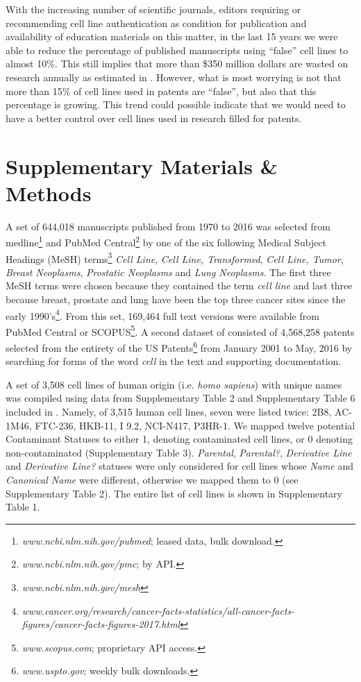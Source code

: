 \documentclass[12pt]{article}
\begin{document}
With the increasing number of scientific journals, editors requiring or recommending cell line authentication as condition for publication and availability of education materials on this matter, in the last 15 years we were able to reduce the percentage of published manuscripts using ``false'' cell lines to almost 10\%. This still implies that more than \$350 million dollars are wasted on research annually as estimated in \cite{freedman2014culture, freedman2015economics}. However, what is most worrying is not that more than 15\% of cell lines used in patents are ``false'', but also that this percentage is growing. This trend could possible indicate that we would need to have a better control over cell lines used in research filled for patents.

\section{Supplementary Materials \& Methods}
A set of 644,018 manuscripts published from 1970 to 2016 was selected from medline\footnote{\textit{www.ncbi.nlm.nih.gov/pubmed}; leased data, bulk download.} and PubMed Central\footnote{\textit{www.ncbi.nlm.nih.gov/pmc}; by API.} by one of the six following Medical Subject Headings (MeSH) terms\footnote{\textit{www.ncbi.nlm.nih.gov/mesh}} \textit{Cell Line}, \textit{Cell Line, Transformed}, \textit{Cell Line, Tumor}, \textit{Breast Neoplasms}, \textit{Prostatic Neoplasms} and \textit{Lung Neoplasms}. The first three MeSH terms were chosen because they contained the term \textit{cell line} and last three because breast, prostate and lung have been the top three cancer sites since the early 1990's\footnote{\textit{www.cancer.org/research/cancer-facts-statistics/all-cancer-facts-figures/cancer-facts-figures-2017.html}}. From this set, 169,464 full text versions were available from PubMed Central or SCOPUS\footnote{\textit{www.scopus.com}; proprietary API access.}. A second dataset of consisted of 4,568,258 patents selected from the entirety of the US Patents\footnote{\textit{www.uspto.gov}; weekly bulk downloads.} from January 2001 to May, 2016 by searching for forms of the word \textit{cell} in the text and supporting documentation.

A set of 3,508 cell lines of human origin (i.e. \textit{homo sapiens}) with unique names was compiled using data from Supplementary Table 2 and Supplementary Table 6 included in \cite{yu2015resource}. Namely, of 3,515 human cell lines, seven were listed twice: 2B8, AC-1M46, FTC-236, HKB-11, I 9.2, NCI-N417, P3HR-1. We mapped twelve potential Contaminant Statuses to either 1, denoting contaminated cell lines, or 0 denoting non-contaminated (Supplementary Table 3). \textit{Parental}, \textit{Parental?}, \textit{Derivative Line} and \textit{Derivative Line?} statuses were only considered for cell lines whose \textit{Name} and \textit{Canonical Name} were different, otherwise we mapped them to 0 (see Supplementary Table 2). The entire list of cell lines is shown in Supplementary Table 1.
\end{document}
